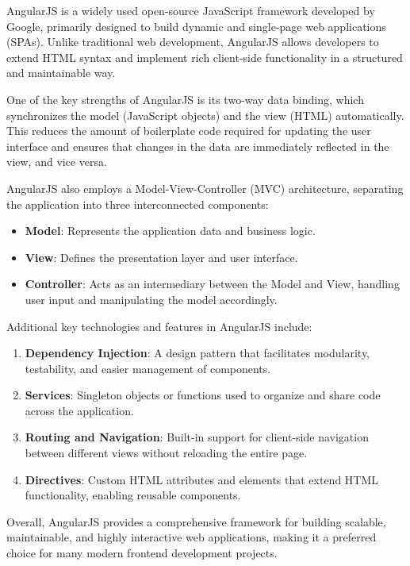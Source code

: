 AngularJS is a widely used open-source JavaScript framework developed by Google, primarily designed to build dynamic and single-page web applications (SPAs). Unlike traditional web development, AngularJS allows developers to extend HTML syntax and implement rich client-side functionality in a structured and maintainable way.\cite{angularJS}

One of the key strengths of AngularJS is its two-way data binding, which synchronizes the model (JavaScript objects) and the view (HTML) automatically. This reduces the amount of boilerplate code required for updating the user interface and ensures that changes in the data are immediately reflected in the view, and vice versa.

AngularJS also employs a Model-View-Controller (MVC) architecture, separating the application into three interconnected components:
\begin{itemize}
    \item \textbf{Model}: Represents the application data and business logic.
    \item \textbf{View}: Defines the presentation layer and user interface.
    \item \textbf{Controller}: Acts as an intermediary between the Model and View, handling user input and manipulating the model accordingly.
\end{itemize}

Additional key technologies and features in AngularJS include:
\begin{enumerate}
    \item \textbf{Dependency Injection}: A design pattern that facilitates modularity, testability, and easier management of components.
    \item \textbf{Services}: Singleton objects or functions used to organize and share code across the application.
    \item \textbf{Routing and Navigation}: Built-in support for client-side navigation between different views without reloading the entire page.
    \item \textbf{Directives}: Custom HTML attributes and elements that extend HTML functionality, enabling reusable components.
\end{enumerate}

Overall, AngularJS provides a comprehensive framework for building scalable, maintainable, and highly interactive web applications, making it a preferred choice for many modern frontend development projects.

